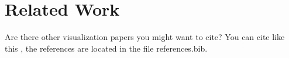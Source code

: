 \section{Related Work}
Are there other visualization papers you might want to cite?
You can cite like this \cite{Isenberg:2017:VMC}, the references are located in the file references.bib.
